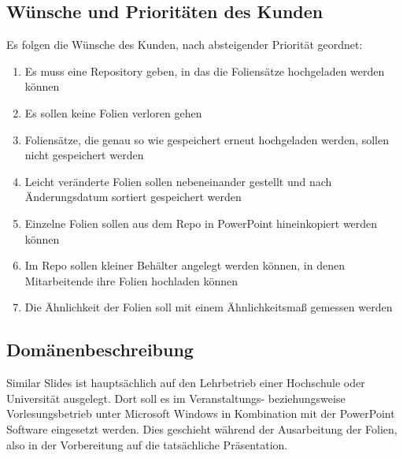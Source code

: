 \subsection{Wünsche und Prioritäten des Kunden}
	Es folgen die Wünsche des Kunden, nach absteigender Priorität geordnet:
	\begin{enumerate}
		\item Es muss eine Repository geben, in das die Foliensätze hochgeladen werden können
        \item Es sollen keine Folien verloren gehen
        \item Foliensätze, die genau so wie gespeichert erneut hochgeladen werden, sollen nicht gespeichert werden
        \item Leicht veränderte Folien sollen nebeneinander gestellt und nach Änderungsdatum sortiert gespeichert werden
        \item Einzelne Folien sollen aus dem Repo in PowerPoint hineinkopiert werden können
        \item Im Repo sollen kleiner Behälter angelegt werden können, in denen Mitarbeitende ihre Folien hochladen können
        \item Die Ähnlichkeit der Folien soll mit einem Ähnlichkeitsmaß gemessen werden
	\end{enumerate}



\subsection{Domänenbeschreibung}

Similar Slides ist hauptsächlich auf den Lehrbetrieb einer Hochschule oder Universität ausgelegt. Dort soll es im Veranstaltungs- beziehungsweise Vorlesungsbetrieb unter Microsoft Windows in Kombination mit der PowerPoint Software eingesetzt werden. Dies geschieht während der Ausarbeitung der Folien, also in der Vorbereitung auf die tatsächliche Präsentation. 


